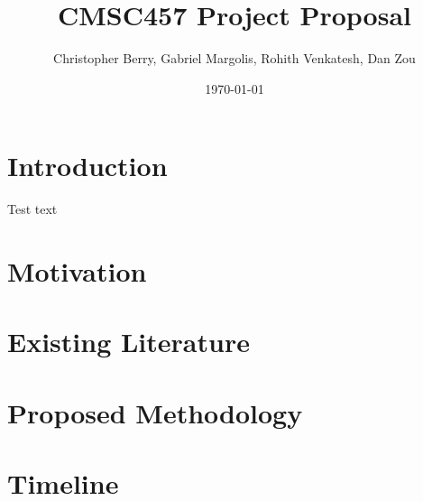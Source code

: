 \documentclass[letter,draft]{article}
\title{CMSC457 Project Proposal}
\author{Christopher Berry, Gabriel Margolis, Rohith Venkatesh, Dan Zou}
\date{\today}
\begin{document}
\maketitle

\section{Introduction}
Test text
\section{Motivation}
\section{Existing Literature}
\section{Proposed Methodology}
\section{Timeline}
\end{document}
